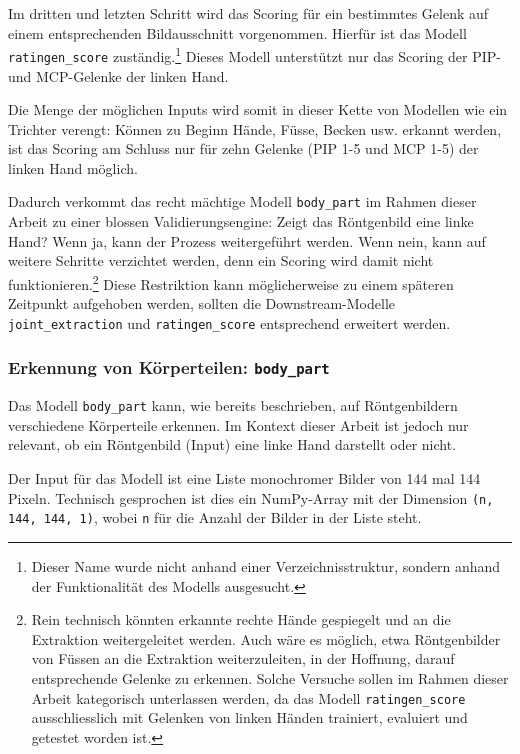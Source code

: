 Im dritten und letzten Schritt wird das Scoring für ein bestimmtes Gelenk auf einem entsprechenden Bildausschnitt vorgenommen. Hierfür ist das Modell \texttt{ratingen\_score} zuständig.\footnote{Dieser Name wurde nicht anhand einer Verzeichnisstruktur, sondern anhand der Funktionalität des Modells ausgesucht.} Dieses Modell unterstützt nur das Scoring der PIP- und MCP-Gelenke der linken Hand.

Die Menge der möglichen Inputs wird somit in dieser Kette von Modellen wie ein Trichter verengt: Können zu Beginn Hände, Füsse, Becken usw. erkannt werden, ist das Scoring am Schluss nur für zehn Gelenke (PIP 1-5 und MCP 1-5) der linken Hand möglich. 

Dadurch verkommt das recht mächtige Modell \texttt{body\_part} im Rahmen dieser Arbeit zu einer blossen Validierungsengine: Zeigt das Röntgenbild eine linke Hand? Wenn ja, kann der Prozess weitergeführt werden. Wenn nein, kann auf weitere Schritte verzichtet werden, denn ein Scoring wird damit nicht funktionieren.\footnote{Rein technisch könnten erkannte rechte Hände gespiegelt und an die Extraktion weitergeleitet werden. Auch wäre es möglich, etwa Röntgenbilder von Füssen an die Extraktion weiterzuleiten, in der Hoffnung, darauf entsprechende Gelenke zu erkennen. Solche Versuche sollen im Rahmen dieser Arbeit kategorisch unterlassen werden, da das Modell \texttt{ratingen\_score} ausschliesslich mit Gelenken von linken Händen trainiert, evaluiert und getestet worden ist.} Diese Restriktion kann möglicherweise zu einem späteren Zeitpunkt aufgehoben werden, sollten die Downstream-Modelle \texttt{joint\_extraction} und \texttt{ratingen\_score} entsprechend erweitert werden.

\subsubsection{Erkennung von Körperteilen: \texttt{body\_part}}
\label{sec:modell-body-part}

Das Modell \texttt{body\_part} kann, wie bereits beschrieben, auf Röntgenbildern verschiedene Körperteile erkennen. Im Kontext dieser Arbeit ist jedoch nur relevant, ob ein Röntgenbild (Input) eine linke Hand darstellt oder nicht.

Der Input für das Modell ist eine Liste monochromer Bilder von 144 mal 144 Pixeln. Technisch gesprochen ist dies ein NumPy-Array mit der Dimension \texttt{(n, 144, 144, 1)}, wobei \texttt{n} für die Anzahl der Bilder in der Liste steht.

